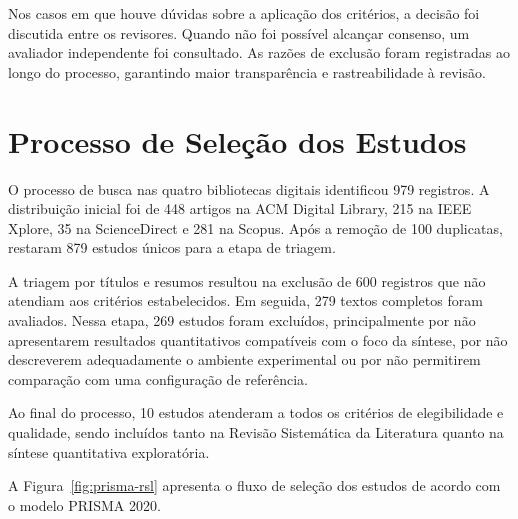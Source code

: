Nos casos em que houve dúvidas sobre a aplicação dos critérios, a decisão foi discutida entre os revisores. Quando não foi possível alcançar consenso, um avaliador independente foi consultado. As razões de exclusão foram registradas ao longo do processo, garantindo maior transparência e rastreabilidade à revisão.

\section{Processo de Seleção dos Estudos}
\label{sec:rsl-selecao}

O processo de busca nas quatro bibliotecas digitais identificou 979 registros. A distribuição inicial foi de 448 artigos na ACM Digital Library, 215 na IEEE Xplore, 35 na ScienceDirect e 281 na Scopus. Após a remoção de 100 duplicatas, restaram 879 estudos únicos para a etapa de triagem.

A triagem por títulos e resumos resultou na exclusão de 600 registros que não atendiam aos critérios estabelecidos. Em seguida, 279 textos completos foram avaliados. Nessa etapa, 269 estudos foram excluídos, principalmente por não apresentarem resultados quantitativos compatíveis com o foco da síntese, por não descreverem adequadamente o ambiente experimental ou por não permitirem comparação com uma configuração de referência.

Ao final do processo, 10 estudos atenderam a todos os critérios de elegibilidade e qualidade, sendo incluídos tanto na Revisão Sistemática da Literatura quanto na síntese quantitativa exploratória.

A Figura~\ref{fig:prisma-rsl} apresenta o fluxo de seleção dos estudos de acordo com o modelo PRISMA 2020.


